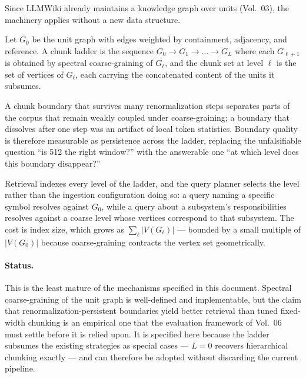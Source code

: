 Since LLMWiki already maintains a knowledge graph over units (Vol.~03), the machinery applies without a new data structure.

\begin{definition}
\label{def:chunk-ladder}
Let $G_0$ be the unit graph with edges weighted by containment, adjacency, and reference. A chunk ladder is the sequence $G_0 \to G_1 \to \dots \to G_L$ where each $G_{\ell+1}$ is obtained by spectral coarse-graining of $G_{\ell}$, and the chunk set at level $\ell$ is the set of vertices of $G_{\ell}$, each carrying the concatenated content of the units it subsumes.
\end{definition}

\begin{observation}
\label{obs:persistence}
A chunk boundary that survives many renormalization steps separates parts of the corpus that remain weakly coupled under coarse-graining; a boundary that dissolves after one step was an artifact of local token statistics. Boundary quality is therefore measurable as persistence across the ladder, replacing the unfalsifiable question ``is 512 the right window?'' with the answerable one ``at which level does this boundary disappear?''
\end{observation}

Retrieval indexes every level of the ladder, and the query planner selects the level rather than the ingestion configuration doing so: a query naming a specific symbol resolves against $G_0$, while a query about a subsystem's responsibilities resolves against a coarse level whose vertices correspond to that subsystem. The cost is index size, which grows as $\sum_{\ell} |V(G_\ell)|$ --- bounded by a small multiple of $|V(G_0)|$ because coarse-graining contracts the vertex set geometrically.

\paragraph{Status.} This is the least mature of the mechanisms specified in this document. Spectral coarse-graining of the unit graph is well-defined and implementable, but the claim that renormalization-persistent boundaries yield better retrieval than tuned fixed-width chunking is an empirical one that the evaluation framework of Vol.~06 must settle before it is relied upon. It is specified here because the ladder subsumes the existing strategies as special cases --- $L=0$ recovers hierarchical chunking exactly --- and can therefore be adopted without discarding the current pipeline.

